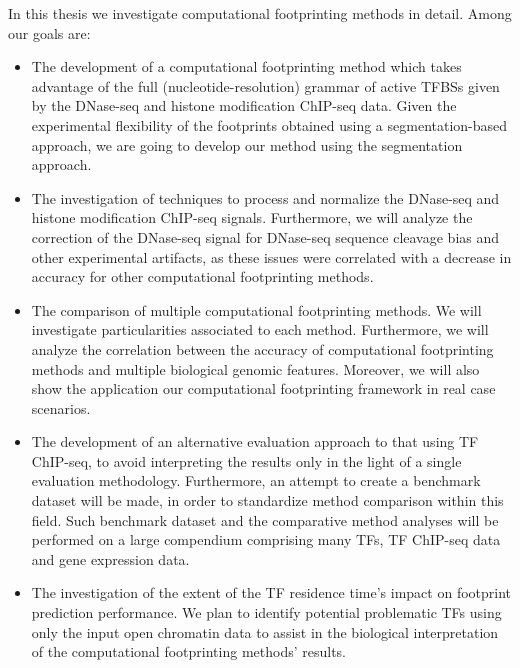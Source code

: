 In this thesis we investigate computational footprinting methods in detail. Among our goals are:
\begin{itemize}
\item The development of a computational footprinting method which takes advantage of the full (nucleotide-resolution) grammar of active TFBSs given by the DNase-seq and histone modification ChIP-seq data. Given the experimental flexibility of the footprints obtained using a segmentation-based approach, we are going to develop our method using the segmentation approach.
\item The investigation of techniques to process and normalize the DNase-seq and histone modification ChIP-seq signals. Furthermore, we will analyze the correction of the DNase-seq signal for DNase-seq sequence cleavage bias and other experimental artifacts, as these issues were correlated with a decrease in accuracy for other computational footprinting methods.
\item The comparison of multiple computational footprinting methods. We will investigate particularities associated to each method. Furthermore, we will analyze the correlation between the accuracy of computational footprinting methods and multiple biological genomic features. Moreover, we will also show the application our computational footprinting framework in real case scenarios.
\item The development of an alternative evaluation approach to that using TF ChIP-seq, to avoid interpreting the results only in the light of a single evaluation methodology. Furthermore, an attempt to create a benchmark dataset will be made, in order to standardize method comparison within this field. Such benchmark dataset and the comparative method analyses will be performed on a large compendium comprising many TFs, TF ChIP-seq data and gene expression data.
\item The investigation of the extent of the TF residence time's impact on footprint prediction performance. We plan to identify potential problematic TFs using only the input open chromatin data to assist in the biological interpretation of the computational footprinting methods' results.
\end{itemize}



